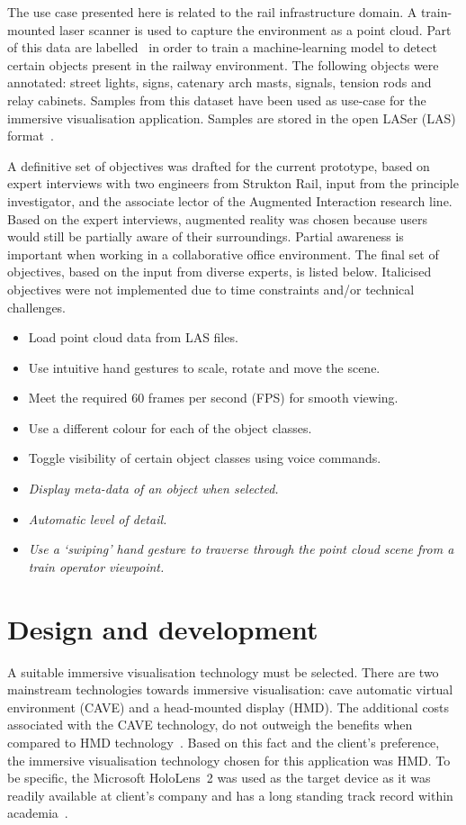 The use case presented here is related to the rail infrastructure domain. A train-mounted laser scanner is used to capture the environment as a point cloud. Part of this data are labelled~\cite{ton2024dataset} in order to train a machine-learning model to detect certain objects present in the railway environment. The following objects were annotated: street lights, signs, catenary arch masts, signals, tension rods and relay cabinets. Samples from this dataset have been used as use-case for the immersive visualisation application. Samples are stored in the open LASer (LAS) format~\cite{LASspec}.

A definitive set of objectives was drafted for the current prototype, based on expert interviews with two engineers from Strukton Rail, input from the principle investigator, and the associate lector of the Augmented Interaction research line. Based on the expert interviews, augmented reality was chosen because users would still be partially aware of their surroundings. Partial awareness is important when working in a collaborative office environment. The final set of objectives, based on the input from diverse experts, is listed below. Italicised objectives were not implemented due to time constraints and/or technical challenges.

\begin{itemize}
    \item Load point cloud data from LAS files.
    \item Use intuitive hand gestures to scale, rotate and move the scene.
    \item Meet the required 60 frames per second (FPS) for smooth viewing.
    \item Use a different colour for each of the object classes.
    \item Toggle visibility of certain object classes using voice commands.
    \item \textit{Display meta-data of an object when selected.}
    \item \textit{Automatic level of detail.}
    \item \textit{Use a `swiping' hand gesture to traverse through the point cloud scene from a train operator viewpoint.}
\end{itemize}

\section{Design and development}
A suitable immersive visualisation technology must be selected. There are two mainstream technologies towards immersive visualisation: cave automatic virtual environment (CAVE) and a head-mounted display (HMD). The additional costs associated with the CAVE technology, do not outweigh the benefits when compared to HMD technology~\cite{Combe23, Cordeil17}. Based on this fact and the client's preference, the immersive visualisation technology chosen for this application was HMD. To be specific, the Microsoft HoloLens~2 was used as the target device as it was readily available at client's company and has a long standing track record within academia~\cite{Park21}.

